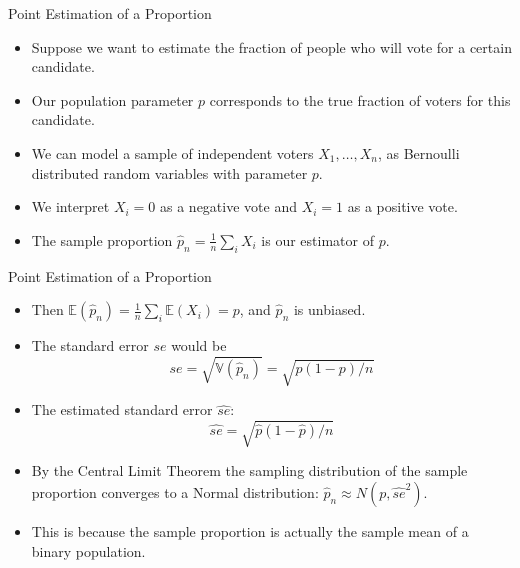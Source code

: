 \documentclass[handout]{beamer}
\begin{document}
\begin{frame}{Point Estimation of a Proportion}
\scriptsize{
\begin{itemize}
 \item Suppose we want to estimate the fraction of people who will vote for a certain candidate.
 \item Our population parameter $p$ corresponds to the true fraction of voters for this candidate.
 \item We can model a sample of independent voters  $X_1, \dots, X_n$, as Bernoulli distributed random variables with parameter $p$.
 
 \item  We interpret $X_i=0$ as a negative vote and $X_i=1$ as a positive vote.
 
 \item The sample proportion $\hat{p}_{n}=\frac 1n \sum_{i}X_{i}$ is our estimator of $p$.
\end{itemize}


} 
\end{frame}


\begin{frame}{Point Estimation of a Proportion}
\scriptsize{
\begin{itemize}
 \item Then $\mathbb{E}(\hat{p}_{n})= \frac 1n \sum_i \mathbb{E}(X_i)=p$, and $\hat{p}_n$ is unbiased.
 \item The standard error $se$ would be
\begin{displaymath}
se = \sqrt{\mathbb{V}(\hat{p}_n)}= \sqrt{p(1-p)/n} 
\end{displaymath}
\item The estimated standard error $\hat{se}$:
\begin{displaymath}
\hat{se} =\sqrt{\hat{p}(1-\hat p)/n} 
\end{displaymath}
\item By the Central Limit Theorem the sampling distribution of the sample proportion converges to a Normal distribution: $\hat{p}_{n} \approx N(p, \hat{se}^2)$.

\item This is because the sample proportion is actually the sample mean of a binary population.
\end{itemize}


} 
\end{frame}
\end{document}

